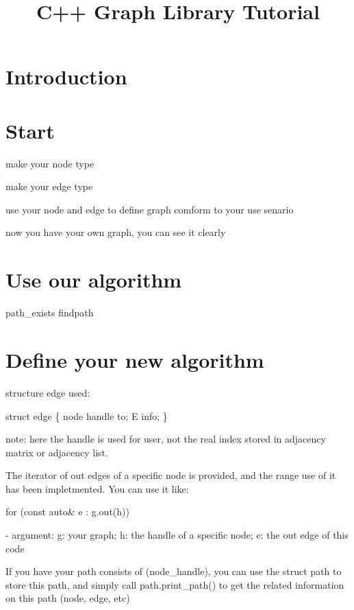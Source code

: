 \documentclass[]{article}
\title{C++ Graph Library Tutorial}
\author{}
\begin{document}
\maketitle
\section{Introduction}
\section{Start}
make your node type

make your edge type

use your node and edge to define graph comform to your use senario

now you have your own graph, you can see it clearly

\section{Use our algorithm}
path\_exists
findpath
\section{Define your new algorithm}

structure edge used:

struct edge \{
	node handle to;
	E info;
\}

note: here the handle is used for user, not the real index stored in adjacency matrix or adjacency list.

The iterator of out edges of a specific node is provided, and the range use of it has been impletmented. You can use it like:

for (const auto\& e : g.out(h))

- argument: g: your graph; h: the handle of a specific node; e: the out edge of this code


If you have your path consists of (node\_handle), you can use the struct path to store this path, and simply call path.print\_path() to get the related information on this path (node, edge, etc)
\end{document}
